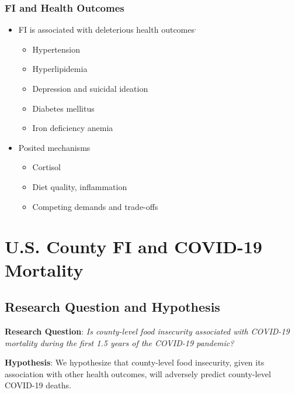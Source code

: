 \documentclass{beamer}
\begin{document}

\begin{frame}
	\frametitle{FI and Health Outcomes}
	
	\begin{itemize}
		\item FI is associated with deleterious health outcomes$^{,}$
		\begin{itemize}
			\item Hypertension
			\item Hyperlipidemia
			\item Depression and suicidal ideation
			\item Diabetes mellitus
			\item Iron deficiency anemia
		\end{itemize}
		
		\item Posited mechanisms
		\begin{itemize}
			\item Cortisol
			\item Diet quality, inflammation
			\item Competing demands and trade-offs
		\end{itemize}
	\end{itemize}
\end{frame}

\section{U.S. County FI and COVID-19 Mortality}
\subsection{Research Question and Hypothesis}

\begin{frame}
	
	\begin{center}
		\textbf{Research Question}: \textit{Is county-level food insecurity associated with COVID-19 mortality during the first 1.5 years of the COVID-19 pandemic?}\\
		
		\vspace{1.5cm}
		
		\textbf{Hypothesis}: We hypothesize that county-level food insecurity, given its association with other health outcomes, will adversely predict county-level COVID-19 deaths.
	\end{center}
\end{frame}
\end{document}
